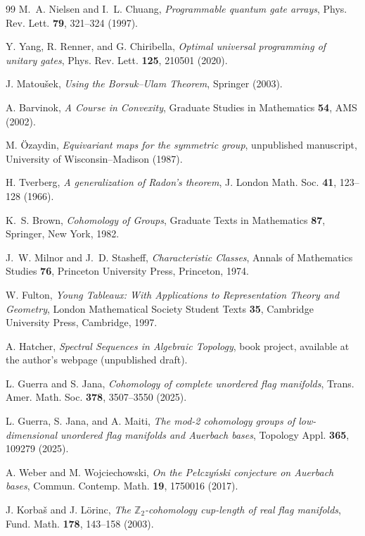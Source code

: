 \documentclass[11pt,a4paper]{article}
\begin{document}
\begin{thebibliography}{99}
M.~A. Nielsen and I.~L. Chuang, \emph{Programmable quantum gate arrays}, Phys. Rev. Lett. \textbf{79}, 321--324 (1997).

Y. Yang, R. Renner, and G. Chiribella, \emph{Optimal universal programming of unitary gates}, Phys. Rev. Lett. \textbf{125}, 210501 (2020).

J. Matou{\v{s}}ek, \emph{Using the Borsuk--Ulam Theorem}, Springer (2003).

A. Barvinok, \emph{A Course in Convexity}, Graduate Studies in Mathematics \textbf{54}, AMS (2002).

M. {\"O}zaydin, \emph{Equivariant maps for the symmetric group}, unpublished manuscript, University of Wisconsin--Madison (1987).

H. Tverberg, \emph{A generalization of Radon's theorem}, J. London Math. Soc. \textbf{41}, 123--128 (1966).

K.~S. Brown, \emph{Cohomology of Groups}, Graduate Texts in Mathematics \textbf{87}, Springer, New York, 1982.

J.~W. Milnor and J.~D. Stasheff, \emph{Characteristic Classes}, Annals of Mathematics Studies \textbf{76}, Princeton University Press, Princeton, 1974.

W. Fulton, \emph{Young Tableaux: With Applications to Representation Theory and Geometry}, London Mathematical Society Student Texts \textbf{35}, Cambridge University Press, Cambridge, 1997.

A. Hatcher, \emph{Spectral Sequences in Algebraic Topology}, book project,
available at the author's webpage (unpublished draft).

L. Guerra and S. Jana, \emph{Cohomology of complete unordered flag manifolds},
Trans. Amer. Math. Soc. \textbf{378}, 3507--3550 (2025).

L. Guerra, S. Jana, and A. Maiti, \emph{The mod-2 cohomology groups of
low-dimensional unordered flag manifolds and Auerbach bases},
Topology Appl. \textbf{365}, 109279 (2025).

A. Weber and M. Wojciechowski, \emph{On the Pe\l{}czy\'nski conjecture on
Auerbach bases}, Commun. Contemp. Math. \textbf{19}, 1750016 (2017).

J. Korba{\v s} and J. L\"orinc, \emph{The $\mathbb Z_2$-cohomology cup-length
of real flag manifolds}, Fund. Math. \textbf{178}, 143--158 (2003).


\end{thebibliography}
\end{document}
